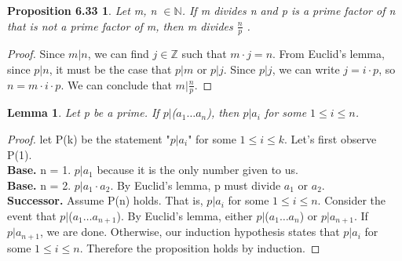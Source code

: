 \documentclass[12pt]{amsart}
\newcommand{\N}{\mathbb{N}}
\newcommand{\Z}{\mathbb{Z}}
\begin{document}
\newtheorem*{prop6.33}{Proposition 6.33}
\begin{prop6.33}
	Let m, n $\in \N$. If m divides n and p is a prime factor of n that is not
	a prime factor of m, then m divides $\frac{n}{p}$ .
\end{prop6.33}

\begin{proof}
	Since $m | n$, we can find $j \in \Z$ such that $m \cdot j = n$. From Euclid's lemma, since $p | n$, it must be the case that $p | m$ or $p | j$. Since $p | j$, we can write $j = i \cdot p$, so $n = m \cdot i \cdot p$. We can conclude that $m | \frac{n}{p}$.
\end{proof}

\newtheorem*{lemma}{Lemma}
\begin{lemma}
	Let p be a prime. If $p | $($a_1 \dots a_{n}$), then $p | a_{i}$ for some $1 \leq i \leq n$.
\end{lemma}

\begin{proof}
	let P(k) be the statement "$p | a_{i}$" for some $1 \leq i \leq k$. Let's first observe P(1).
	\\\textbf{Base.} n = 1. $p | a_1$ because it is the only number given to us.
	\\\textbf{Base.} n = 2. $p | a_1 \cdot a_{2}$. By Euclid's lemma, p must divide $a_{1}$ or $a_{2}$.
	\\\textbf{Successor.} Assume P(n) holds. That is, $p | a_{i}$ for some $1 \leq i \leq n$. Consider the event that $p | $($a_1 \dots a_{n+1}$). By Euclid's lemma, either $p | $($a_1 \dots a_{n}$) or $p | a_{n + 1}$. If $p | a_{n + 1}$, we are done. Otherwise, our induction hypothesis states that $p | a_{i}$ for some $1 \leq i \leq n$. Therefore the proposition holds by induction.
\end{proof}
\end{document}
